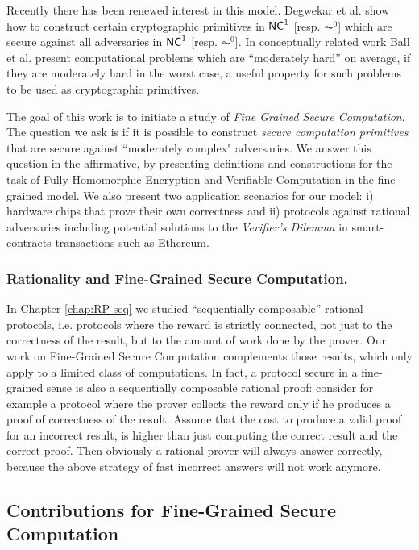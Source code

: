 Recently there has been renewed interest in this model. Degwekar et al. \cite{fgcrypto} show how to construct certain cryptographic 
primitives in ${\mathsf{NC}}^1$ [resp. $\AC^0$] which are secure against all adversaries in ${\mathsf{NC}}^1$ [resp. $\AC^0$]. In conceptually related work Ball et al. \cite{fghardness} present computational problems which are ``moderately hard'' on average, if they are moderately hard in the worst case, a useful property for such problems to be used as cryptographic primitives. 

The goal of this work is to initiate a study of {\em Fine Grained Secure Computation}. The question we ask is if it is possible to construct {\em secure computation primitives} that are secure against ``moderately complex" adversaries. We answer this question in the affirmative, by presenting definitions and constructions for the task of Fully Homomorphic Encryption and Verifiable Computation in the fine-grained model. We also present two application scenarios for our model: i) hardware chips that prove their own correctness and ii) protocols against rational adversaries including potential solutions to the {\em Verifier's Dilemma} in smart-contracts transactions such as Ethereum.

\subsubsection{Rationality and Fine-Grained Secure Computation.}
In Chapter \ref{chap:RP-seq} we studied ``sequentially composable'' rational protocols, i.e. protocols where the reward is strictly connected, not just to the correctness of the result, but to the amount of work done by the prover. Our work on Fine-Grained Secure Computation complements those results, which only apply to a limited class of computations. In fact, a protocol secure in a fine-grained sense is also a sequentially composable rational proof:
consider for example a protocol where the prover collects the reward only if he produces a proof of correctness of the result. Assume that the cost to  produce a valid proof for an incorrect result, is higher than just computing the correct result and the correct proof. Then obviously a rational prover will always answer correctly, because the above strategy of fast incorrect answers will not work anymore. 

\subsection{Contributions for Fine-Grained Secure Computation}

